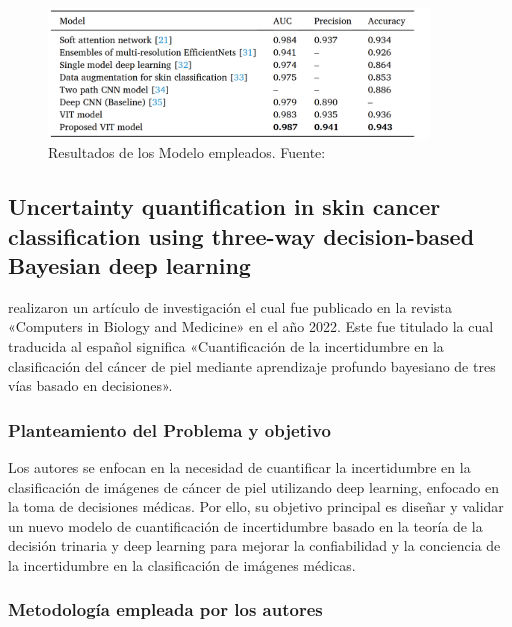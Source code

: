 \begin{figure}[h]
	\begin{center}
		\includegraphics[width=0.9\textwidth]{2/figuras/An_improved_transformer_network _imagen_01.png}
		\caption{Resultados de los Modelo empleados. Fuente: \cite{xin2022improved}}
		\label{1:fig 12}
	\end{center}
\end{figure}




\subsection{Uncertainty quantification in skin cancer classification using three-way decision-based Bayesian deep learning \citep*{abdar2021uncertainty}}
\citeauthor{abdar2021uncertainty} realizaron un artículo de investigación el cual fue publicado en la revista «Computers in Biology and Medicine» en el año 2022. Este fue titulado  la cual traducida al español significa «Cuantificación de la incertidumbre en la clasificación del cáncer de piel mediante aprendizaje profundo bayesiano de tres vías basado en decisiones».
\subsubsection{Planteamiento del Problema y objetivo}
Los autores se enfocan en la necesidad de cuantificar la incertidumbre en la clasificación de imágenes de cáncer de piel utilizando deep learning, enfocado en la toma de decisiones médicas. Por ello, su objetivo principal es diseñar y validar un nuevo modelo de cuantificación de incertidumbre basado en la teoría de la decisión trinaria y deep learning  para mejorar la confiabilidad y la conciencia de la incertidumbre en la clasificación de imágenes médicas.

\subsubsection{Metodología empleada por los autores}
\newcommand{\TUQSone}{Recopilación de Datos: Los autores recopilaron dos conjuntos de datos de 2 partes: uno de Kaggle y otro del ISIC 2019. Los cuales se realizo un preprocesamiento para preparar las imágenes para su análisis.
}

